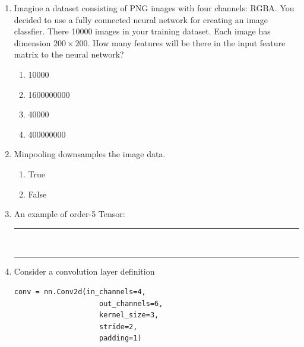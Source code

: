 \documentclass[11pt, xcolor=dvipsnames,svgnames,x11names]{article}
\begin{document}
\begin{enumerate}
\begin{enumerate}
\item 325
\item 300
\item 55
\item 400
\end{enumerate}

\item Imagine a dataset consisting of PNG images with four channels: RGBA. You decided to use a fully connected neural network for creating an image classfier. There 10000 images in your training dataset. Each image has dimension $200\times 200$. How many features will be there in the input feature matrix to the neural network?

\begin{enumerate}
\item 10000
\item 1600000000
\item 40000
\item 400000000
\end{enumerate}

\item Minpooling downsamples the image data.
\begin{enumerate}
\item True
\item False
\end{enumerate}

\item An example of order-5 Tensor:
\begin{tcolorbox}[colback=white, colframe=headerRed!75!black]
\vspace{1.5em}
\noindent\rule{\textwidth}{0.4pt}\\[1.5em]
\noindent\rule{\textwidth}{0.4pt}
\vspace{0.5em}
\end{tcolorbox}

\item Consider a convolution layer definition


          \begin{verbatim}
conv = nn.Conv2d(in_channels=4,  
                    out_channels=6, 
                    kernel_size=3, 
                    stride=2,
                    padding=1)
\end{verbatim}


\end{enumerate}
\end{document}

